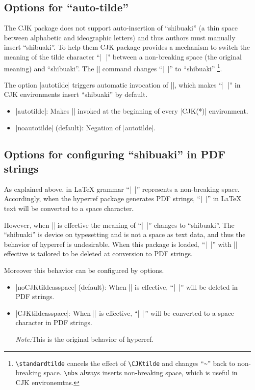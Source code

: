 \documentclass[a4paper]{article}
\newcommand*{\Cs}[1]{\texttt{\textbackslash #1}}
\newcommand{\Pkg}[1]{\textsf{#1}}
\newcommand{\Note}{\par\noindent \emph{Note:}\quad}
\newcommand{\Means}{:\hspace{1em plus 1em}}
\begin{document}
\subsection{Options for ``auto-tilde''}

The \Pkg{CJK} package does not support auto-insertion of ``shibuaki''
(a thin space between alphabetic and ideographic letters)
and thus authors must manually insert ``shibuaki''.
To help them \Pkg{CJK} package provides a mechanism
to switch the meaning of the tilde character ``|~|''
between a non-breaking space (the original meaning)
and ``shibuaki''.
The |\autotilde| command changes ``|~|'' to ``shibuaki''%
\footnote{\Cs{standardtilde} cancels the effect of \Cs{CJKtilde}
  and changes ``\texttt{\textasciitilde}'' back to non-breaking space.
  \Cs{nbs} always inserts non-breaking space,
  which is useful in CJK environemtns.}.

The option |autotilde| triggers automatic invocation of |\CJKtilde|,
which makes ``|~|'' in CJK environments insert ``shibuaki''
by default.

\begin{itemize}
\item |autotilde|\Means
  Makes |\CJKtilde| invoked at the beginning of every |CJK(*)|
  environment.
\item |noautotilde| (default)\Means
  Negation of |autotilde|.
\end{itemize}

\subsection{Options for configuring ``shibuaki'' in PDF strings}

As explained above,
in {\LaTeX} grammar ``|~|'' represents a non-breaking space.
Accordingly, when the \Pkg{hyperref} package generates PDF strings,
``|~|'' in {\LaTeX} text will be converted to a space character.

However, when |\CJKtilde| is effective
the meaning of ``|~|'' changes to ``shibuaki''.
The ``shibuaki'' is device on typesetting
and is not a space as text data,
and thus the behavior of \Pkg{hyperref} is undesirable.
When this package is loaded, ``|~|'' with |\CJKtilde| effective
is tailored to be deleted at conversion to PDF strings.

Moreover this behavior can be configured by options.

\begin{itemize}
\item |noCJKtildeasspace| (default)\Means
  When |\CJKtilde| is effective,
  ``|~|'' will be deleted in PDF strings.
\item |CJKtildeasspace|\Means
  When |\CJKtilde| is effective,
  ``|~|'' will be converted to a space character in PDF strings.
  \Note This is the original behavior of \Pkg{hyperref}.
\end{itemize}
\end{document}
